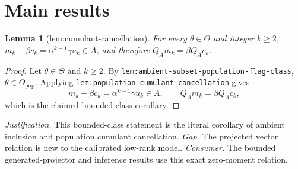 \documentclass{article}
\newtheorem{lemma}{Lemma}
\begin{document}
\section{Main results}

\begin{lemma}[lem:cumulant-cancellation]\label{lem:cumulant-cancellation}
For every \(\theta\in\Theta\) and integer \(k\ge2\), \(m_k-\beta c_k=\alpha^{k-1}\gamma u_k\in A\), and therefore \(Q_Am_k=\beta Q_Ac_k\).
\end{lemma}
\begin{proof}
Let \(\theta\in\Theta\) and \(k\ge2\). By \texttt{lem:ambient-subset-population-flag-class}, \(\theta\in\Theta_{\mathrm{pop}}\). Applying \texttt{lem:population-cumulant-cancellation} gives
\[
m_k-\beta c_k=\alpha^{k-1}\gamma u_k\in A,\qquad
Q_Am_k=\beta Q_Ac_k,
\]
which is the claimed bounded-class corollary.
\end{proof}
\par\smallskip\noindent \textit{Justification.} This bounded-class statement is the literal corollary of ambient inclusion and population cumulant cancellation. \textit{Gap.} The projected vector relation is new to the calibrated low-rank model. \textit{Consumer.} The bounded generated-projector and inference results use this exact zero-moment relation.
\end{document}
